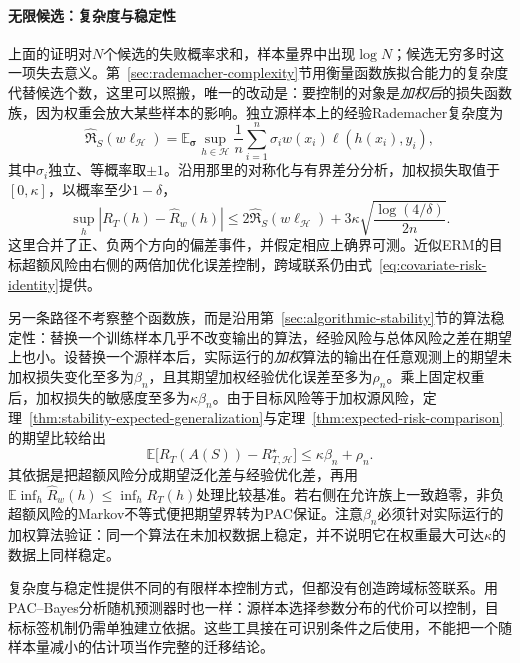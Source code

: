 \paragraph{无限候选：复杂度与稳定性}
\label{sec:transfer-stability}
上面的证明对$N$个候选的失败概率求和，样本量界中出现$\log N$；候选无穷多时这一项失去意义。第~\ref{sec:rademacher-complexity}节用衡量函数族拟合能力的复杂度代替候选个数，这里可以照搬，唯一的改动是：要控制的对象是\emph{加权后}的损失函数族，因为权重会放大某些样本的影响。独立源样本上的经验Rademacher复杂度为
\[
 \widehat{\mathfrak R}_S(w\ell_{\mathcal H})
 =\mathbb E_{\bm\sigma}\sup_{h\in\mathcal H}
 \frac1n\sum_{i=1}^n\sigma_i w(x_i)\ell(h(x_i),y_i),
\]
其中$\sigma_i$独立、等概率取$\pm1$。沿用那里的对称化与有界差分分析，加权损失取值于$[0,\kappa]$，以概率至少$1-\delta$，
\[
 \sup_h|R_T(h)-\widehat R_w(h)|
 \leq2\widehat{\mathfrak R}_S(w\ell_{\mathcal H})
      +3\kappa\sqrt{\frac{\log(4/\delta)}{2n}}.
\]
这里合并了正、负两个方向的偏差事件，并假定相应上确界可测。近似ERM的目标超额风险由右侧的两倍加优化误差控制，跨域联系仍由式~\eqref{eq:covariate-risk-identity}提供。

另一条路径不考察整个函数族，而是沿用第~\ref{sec:algorithmic-stability}节的算法稳定性：替换一个训练样本几乎不改变输出的算法，经验风险与总体风险之差在期望上也小。设替换一个源样本后，实际运行的\emph{加权}算法的输出在任意观测上的期望未加权损失变化至多为$\beta_n$，且其期望加权经验优化误差至多为$\rho_n$。乘上固定权重后，加权损失的敏感度至多为$\kappa\beta_n$。由于目标风险等于加权源风险，定理~\ref{thm:stability-expected-generalization}与定理~\ref{thm:expected-risk-comparison}的期望比较给出
\begin{equation}
 \mathbb E\big[R_T(A(S))-R_{T,\mathcal H}^{\star}\big]
 \leq\kappa\beta_n+\rho_n.
 \label{eq:transfer-stability-excess}
\end{equation}
其依据是把超额风险分成期望泛化差与经验优化差，再用$\mathbb E\inf_h\widehat R_w(h)\leq\inf_hR_T(h)$处理比较基准。若右侧在允许族上一致趋零，非负超额风险的Markov不等式便把期望界转为PAC保证。注意$\beta_n$必须针对实际运行的加权算法验证：同一个算法在未加权数据上稳定，并不说明它在权重最大可达$\kappa$的数据上同样稳定。

复杂度与稳定性提供不同的有限样本控制方式，但都没有创造跨域标签联系。用PAC--Bayes分析随机预测器时也一样：源样本选择参数分布的代价可以控制，目标标签机制仍需单独建立依据。这些工具接在可识别条件之后使用，不能把一个随样本量减小的估计项当作完整的迁移结论。

